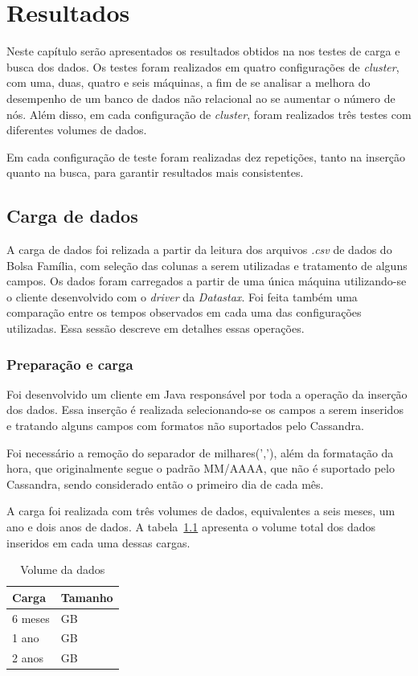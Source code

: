 \chapter{Resultados}

Neste capítulo serão apresentados os resultados obtidos na nos testes de carga e busca dos dados. Os testes foram realizados em quatro configurações de \emph{cluster}, com uma, duas, quatro e seis máquinas, a fim de se analisar a melhora do desempenho de um banco de dados não relacional ao se aumentar o número de nós. Além disso, em cada configuração de \emph{cluster}, foram realizados três testes com diferentes volumes de dados. 

Em cada configuração de teste foram realizadas dez repetições, tanto na inserção quanto na busca, para garantir resultados mais consistentes. 

\section{Carga de dados}
A carga de dados foi relizada a partir da leitura dos arquivos \emph{.csv} de dados do Bolsa Família, com seleção das colunas a serem utilizadas e tratamento de alguns campos.
Os dados foram carregados a partir de uma única máquina utilizando-se o cliente desenvolvido com o \emph{driver} da \emph{Datastax}. Foi feita também uma comparação entre os tempos observados em cada uma das configurações utilizadas. Essa sessão descreve em detalhes essas operações.

\subsection{Preparação e carga}
Foi desenvolvido um cliente em Java responsável por toda a operação da inserção dos dados. Essa inserção é realizada selecionando-se os campos a serem inseridos e tratando alguns campos com formatos não suportados pelo Cassandra. 

Foi necessário a remoção do separador de milhares(','), além da formatação da hora, que originalmente segue o padrão MM/AAAA, que não é suportado pelo Cassandra, sendo considerado então o primeiro dia de cada mês.

A carga foi realizada com três volumes de dados, equivalentes a seis meses, um ano e dois anos de dados. A tabela~\ref{tab:volume} apresenta o volume total dos dados inseridos em cada uma dessas cargas.

\begin{table}[]
	\centering
	\caption{Volume da dados}
	\label{tab:volume}
	\begin{tabular}{ll}
		\textbf{Carga} & \textbf{Tamanho} \\ \hline
		6 meses        &  GB             \\ \hline
		1 ano          &  GB             \\ \hline
		2 anos         &  GB             \\ \hline
	\end{tabular}
\end{table}

